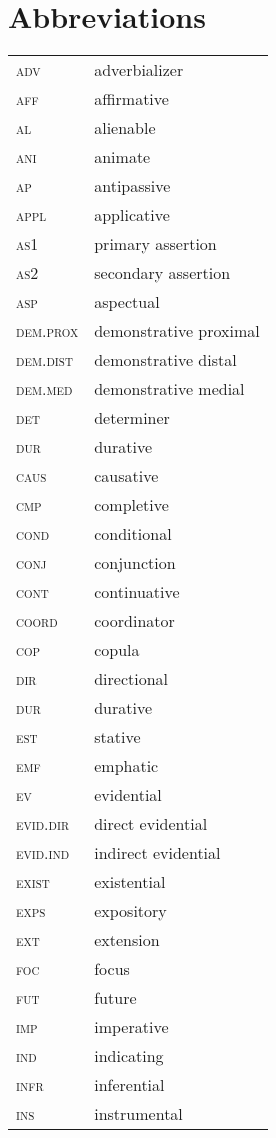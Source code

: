 \documentclass[output=paper]{langsci/langscibook}
\begin{document}
\section*{Abbreviations}
\begin{tabularx}{.5\textwidth}{lQ}
    \textsc{adv}& adverbializer\\
    \textsc{aff}& affirmative\\
    \textsc{al}& alienable\\
    \textsc{ani}& animate\\
    \textsc{ap}& antipassive\\
    \textsc{appl}& applicative\\
    \textsc{as1}& primary assertion\\
    \textsc{as2}& secondary assertion\\
    \textsc{asp}& aspectual\\
    \textsc{dem.prox}& demonstrative proximal\\
    \textsc{dem.dist}& demonstrative distal\\
    \textsc{dem.med}& demonstrative medial\\
    \textsc{det}& determiner\\
    \textsc{dur}& durative\\
    \textsc{caus}& causative\\
    \textsc{cmp}& completive\\
    \textsc{cond}& conditional\\
    \textsc{conj}& conjunction\\
    \textsc{cont}& continuative\\
    \textsc{coord}& coordinator\\
    \textsc{cop}& copula\\
    \textsc{dir}& directional\\ 
    \textsc{dur}& durative\\ 
    \textsc{est}& stative\\ 
    \textsc{emf}& emphatic\\ 
    \textsc{ev}& evidential\\ 
    \textsc{evid.dir}& direct evidential\\ 
    \textsc{evid.ind}& indirect evidential\\ 
    \textsc{exist}& existential\\ 
    \textsc{exps}& expository\\ 
    \textsc{ext}& extension\\ 
    \textsc{foc}& focus\\ 
    \textsc{fut}& future\\ 
    \textsc{imp}& imperative\\ 
    \textsc{ind}& indicating\\ 
    \textsc{infr}& inferential\\
    \textsc{ins}& instrumental\\
\end{tabularx}
\end{document}
